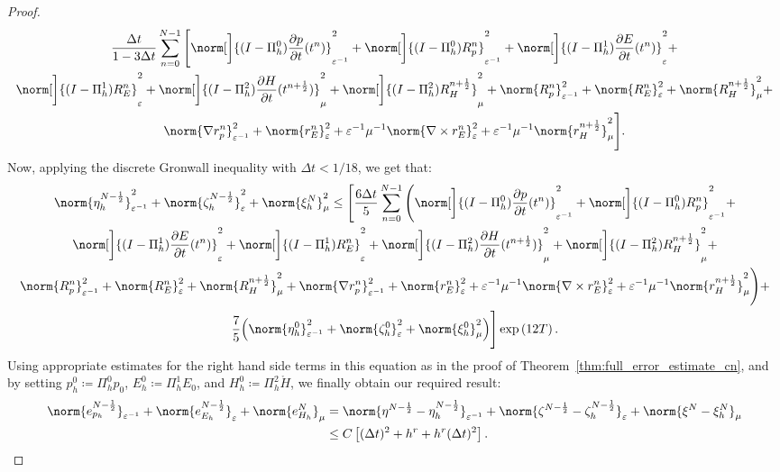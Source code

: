 \documentclass{amsart}
\theoremstyle{thmstyleone}%
\theoremstyle{thmstyletwo}%
\theoremstyle{thmstylethree}%
\begin{document}
\begin{proof}
\begin{multline*}
  \dfrac{ \Delta t}{1 - 3 \Delta t} \sum\limits_{n = 0}^{N - 1} \Bigg[ \norm[\bigg]{(I - \Pi_h^0) \dfrac{\partial p}{\partial t}(t^n)}^2_{\varepsilon^{-1}} + \norm[\bigg]{(I - \Pi_h^0) R_p^n}^2_{\varepsilon^{-1}} + \norm[\bigg]{(I - \Pi_h^1) \dfrac{\partial E}{\partial t}(t^n)}^2_{\varepsilon} + \\
    \norm[\bigg]{(I - \Pi_h^1) R_E^n}^2_{\varepsilon} + \norm[\bigg]{(I - \Pi_h^2) \dfrac{\partial H}{\partial t}(t^{n + \frac{1}{2}})}^2_\mu + \norm[\bigg]{(I - \Pi_h^2) R_H^{n + \frac{1}{2}}}^2_{\mu} + \norm{R_p^n}^2_{\varepsilon^{-1}} + \norm{R_E^n}^2_{\varepsilon} + \norm{R_H^{n + \frac{1}{2}}}^2_{\mu} + \\
\norm{\nabla r_p^n} ^2_{\varepsilon^{-1}} + \norm{r_E^n}^2_{\varepsilon} + \varepsilon^{-1} \mu^{-1} \norm{\nabla \times r_E^n}^2_{\varepsilon} +  \varepsilon^{-1} \mu^{-1} \norm{r_H^{n + \frac{1}{2}}}^2_{\mu} \Bigg].
\end{multline*}
Now, applying the discrete Gronwall inequality with $\Delta t < 1/18$, we get that:
\begin{multline*}
  \norm{\eta_h^{N - \frac{1}{2}}}^2_{\varepsilon^{-1}} + \norm{\zeta_h^{N - \frac{1}{2}}}^2_{\varepsilon} + \norm{\xi_h^N}^2_{\mu} \le \Bigg[ \dfrac{6 \Delta t}{5} \sum\limits_{n = 0}^{N - 1} \Bigg( \norm[\bigg]{(I - \Pi_h^0) \dfrac{\partial p}{\partial t}(t^n)}^2_{\varepsilon^{-1}} + \norm[\bigg]{(I - \Pi_h^0) R_p^n}^2_{\varepsilon^{-1}} + \\
  \norm[\bigg]{(I - \Pi_h^1) \dfrac{\partial E}{\partial t}(t^n)}^2_{\varepsilon}  + \norm[\bigg]{(I - \Pi_h^1) R_E^n}^2_{\varepsilon} + \norm[\bigg]{(I - \Pi_h^2) \dfrac{\partial H}{\partial t}(t^{n + \frac{1}{2}})}^2_\mu + \norm[\bigg]{(I - \Pi_h^2) R_H^{n + \frac{1}{2}}}^2_{\mu} + \\
  \norm{R_p^n}^2_{\varepsilon^{-1}} + \norm{R_E^n}^2_{\varepsilon} + \norm{R_H^{n + \frac{1}{2}}}^2_{\mu} + \norm{\nabla r_p^n} ^2_{\varepsilon^{-1}} + \norm{r_E^n}^2_{\varepsilon} + \varepsilon^{-1} \mu^{-1} \norm{\nabla \times r_E^n}^2_{\varepsilon} +  \varepsilon^{-1} \mu^{-1} \norm{r_H^{n + \frac{1}{2}}}^2_{\mu}\Bigg) + \\ \dfrac{7}{5} \Big( \norm{\eta_h^0}^2_{\varepsilon^{-1}} + \norm{\zeta_h^0}^2_{\varepsilon} + \norm{\xi_h^0}^2_{\mu} \Big) \Bigg] \exp \left( 12 T \right).
\end{multline*}
Using appropriate estimates for the right hand side terms in this equation as in the proof of Theorem~\ref{thm:full_error_estimate_cn}, and by setting $p_h^0 \coloneq \Pi_h^0 p_0$, $E_h^0 \coloneq \Pi_h^1 E_0$, and $H_h^0 \coloneq \Pi_h^2 \mathring{H}$, we finally obtain our required result:
\begin{align*}
  \norm{e_{p_h}^{N - \frac{1}{2}}}_{\varepsilon^{-1}} + \norm{e_{E_h}^{N - \frac{1}{2}}}_{\varepsilon} + \norm{e_{H_h}^{N}}_{\mu} &= \norm{\eta^{N - \frac{1}{2}} - \eta^{N - \frac{1}{2}}_h}_{\varepsilon^{-1}} + \norm{\zeta^{N - \frac{1}{2}} - \zeta^{N - \frac{1}{2}}_h}_{\varepsilon} + \norm{\xi^N - \xi^N_h}_\mu \\
  &\le C \left[ (\Delta t )^2 + h^r + h^r (\Delta t)^2 \right]. \qedhere
\end{align*}
\end{proof}
\end{document}
